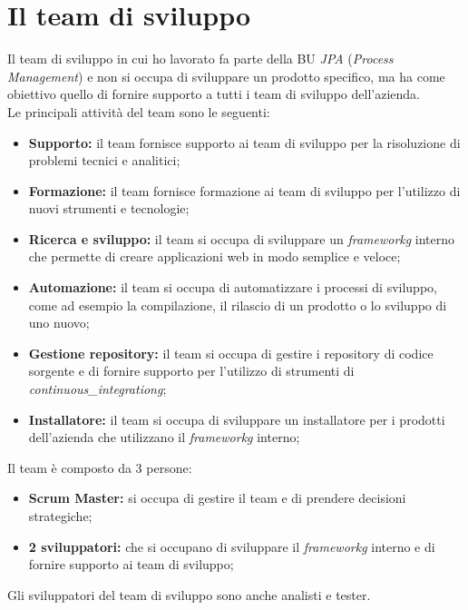 \newpage

\section{Il team di sviluppo}
Il team di sviluppo in cui ho lavorato fa parte della BU \textit{JPA} (\textit{Process Management}) e non si
occupa di sviluppare un prodotto specifico, ma ha come obiettivo quello di fornire supporto a tutti i team di sviluppo
dell'azienda. \\
Le principali attività del team sono le seguenti:
\begin{itemize}
  \item \textbf{Supporto:} il team fornisce supporto ai team di sviluppo per la risoluzione di problemi tecnici e analitici;
  \item \textbf{Formazione:} il team fornisce formazione ai team di sviluppo per l'utilizzo di nuovi strumenti e tecnologie;
  \item \textbf{Ricerca e sviluppo:} il team si occupa di sviluppare un \textit{\gls{frameworkg}} interno che permette di creare applicazioni web in modo semplice e veloce;
  \item \textbf{Automazione:} il team si occupa di automatizzare i processi di sviluppo, come ad esempio la compilazione, il rilascio di un prodotto o lo sviluppo di uno nuovo; 
  \item \textbf{Gestione repository:} il team si occupa di gestire i repository di codice sorgente e di fornire supporto per l'utilizzo di strumenti di \textit{\gls{continuous_integrationg}};
  \item \textbf{Installatore:} il team si occupa di sviluppare un installatore per i prodotti dell'azienda che utilizzano il \textit{\gls{frameworkg}} interno;
\end{itemize}

\noindent Il team è composto da 3 persone:
\begin{itemize}
  \item \textbf{Scrum Master:} si occupa di gestire il team e di prendere decisioni strategiche;
  \item \textbf{2 sviluppatori:} che si occupano di sviluppare il \textit{frameworkg} interno e di fornire supporto ai team di sviluppo;
\end{itemize}

Gli sviluppatori del team di sviluppo sono anche analisti e tester. \\



